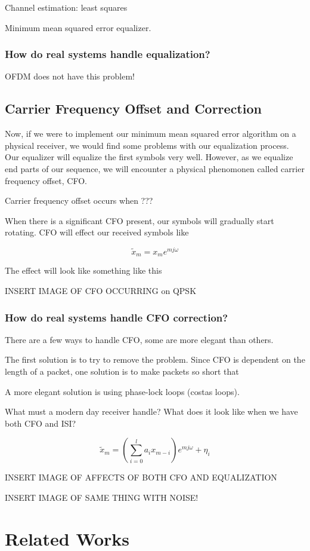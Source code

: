 Channel estimation: least squares

Minimum mean squared error equalizer.
 
\subsubsection{How do real systems handle equalization?}

OFDM does not have this problem!

 
\subsection{Carrier Frequency Offset and Correction}

Now, if we were to implement our minimum mean squared error algorithm on a physical receiver, we would find some problems with our equalization process.  
Our equalizer will equalize the first symbols very well.  However, as we equalize end parts of our sequence, we will encounter a physical phenomonen called carrier frequency offset, CFO.

Carrier frequency offset occurs when ???

When there is a significant CFO present, our symbols will gradually start rotating. CFO will effect our received symbols like

$$\tilde{x}_m = x_m e^{mj\omega}$$


The effect will look like something like this 

INSERT IMAGE OF CFO OCCURRING on QPSK

\subsubsection{How do real systems handle CFO correction?}

There are a few ways to handle CFO, some are more elegant than others. 

The first solution is to try to remove the problem.  Since CFO is dependent on the length of a packet, one solution is to make packets so short that 

A more elegant solution is using phase-lock loops (costas loops).

What must a modern day receiver handle?  What does it look like when we have both CFO and ISI?

$$\tilde{x}_m = (\sum_{i=0}^l a_i x_{m-i})e^{mj\omega} + \eta_i$$

INSERT IMAGE OF AFFECTS OF BOTH CFO AND EQUALIZATION

INSERT IMAGE OF SAME THING WITH NOISE!

\section{Related Works}

